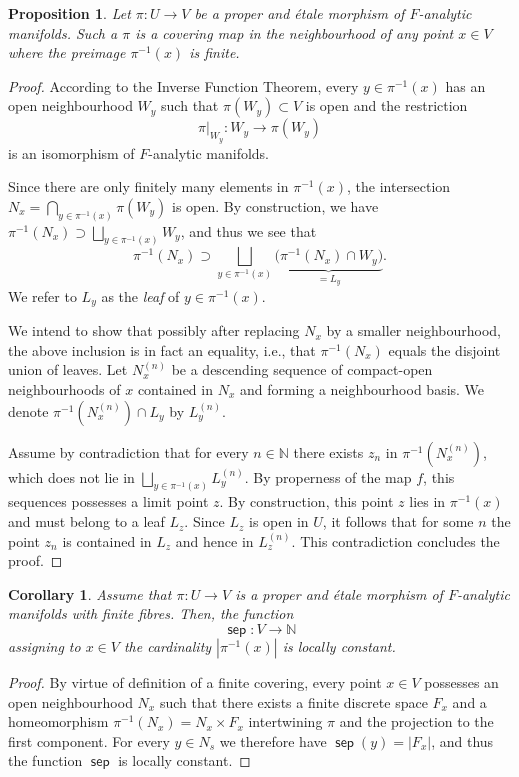\documentclass{article}
\DeclareMathOperator{\sep}{\mathsf{sep}}
\theoremstyle{definition}
\theoremstyle{plain}
\newtheorem{proposition}[definition]{Proposition}
\newtheorem{corollary}[definition]{Corollary}
\begin{document}
\begin{proposition}
Let $\pi\colon U \to V$ be a proper and \'etale morphism of $F$-analytic manifolds. Such a $\pi$ is a covering map in the neighbourhood of any point $x \in V$ where the preimage $\pi^{-1}(x)$ is finite.
\end{proposition}
\begin{proof}
According to the Inverse Function Theorem, every $y \in \pi^{-1}(x)$ has an open neighbourhood $W_y$ such that $\pi(W_y) \subset V$ is open and the restriction 
$$\pi|_{W_y}\colon W_y \to \pi(W_y)$$
is an isomorphism of $F$-analytic manifolds.

Since there are only finitely many elements in $\pi^{-1}(x)$, the intersection
$N_x=\bigcap_{y \in \pi^{-1}(x)} \pi(W_y)$
is open. By construction, we have $\pi^{-1}(N_x) \supset \bigsqcup_{y \in \pi^{-1}(x)} W_y$, and thus we see that 
$$\pi^{-1}(N_x) \supset \bigsqcup_{y \in \pi^{-1}(x)} \underbrace{\big(\pi^{-1}(N_x) \cap W_y\big)}_{= L_y}.$$
We refer to $L_y$ as the \emph{leaf} of $y \in \pi^{-1}(x)$.

We intend to show that possibly after replacing $N_x$ by a smaller neighbourhood, the above inclusion is in fact an equality, i.e., that $\pi^{-1}(N_x)$ equals the disjoint union of leaves. Let $N_x^{(n)}$ be a descending sequence of compact-open neighbourhoods of $x$ contained in $N_x$ and forming a neighbourhood basis. We denote $\pi^{-1}(N_x^{(n)}) \cap L_y$ by $L_y^{(n)}$.

Assume by contradiction that for every $n \in \mathbb{N}$ there exists $z_n$ in $\pi^{-1}(N_x^{(n)})$, which does not lie in $\bigsqcup_{y \in \pi^{-1}(x)} L_y^{(n)}$. By properness of the map $f$, this sequences possesses a limit point $z$. By construction, this point $z$ lies in $\pi^{-1}(x)$ and must belong to a leaf $L_z$. Since $L_z$ is open in $U$, it follows that for some $n$ the point $z_n$ is contained in $L_z$ and hence in $L_z^{(n)}$. This contradiction concludes the proof. 
\end{proof}

\begin{corollary}\label{cor:loc-constant}
Assume that $\pi\colon U \to V$ is a proper and \'etale morphism of $F$-analytic manifolds with finite fibres. Then, the function 
$$\sep \colon V \to \mathbb{N}$$
assigning to $x \in V$ the cardinality $|\pi^{-1}(x)|$ is locally constant.
\end{corollary}
\begin{proof}
 By virtue of definition of a finite covering, every point $x \in V$ possesses an open neighbourhood $N_x$ such that there exists a finite discrete space $F_x$ and a homeomorphism $\pi^{-1}(N_x) = N_x \times F_x$ intertwining $\pi$ and the projection to the first component. For every $y \in N_s$ we therefore have $\sep(y) = |F_x|$, and thus the function $\sep$ is locally constant.  
\end{proof}
\end{document}
